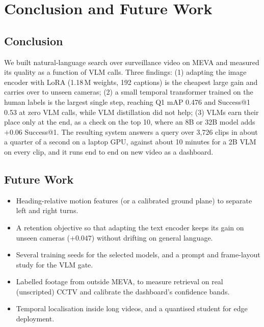 \documentclass[11pt,a4paper]{article}
\begin{document}
\section{Conclusion and Future Work}\label{sec:concl}
\subsection{Conclusion}
We built natural-language search over surveillance video on MEVA and measured its quality as a function of VLM
calls. Three findings: (1) adapting the image encoder with LoRA (1.18\,M weights, 192 captions) is the cheapest
large gain and carries over to unseen cameras; (2) a small temporal transformer trained on the human labels is the
largest single step, reaching Q1 mAP 0.476 and Success@1 0.53 at zero VLM calls, while VLM distillation did not
help; (3) VLMs earn their place only at the end, as a check on the top 10, where an 8B or 32B model adds $+0.06$
Success@1. The resulting system answers a query over 3,726 clips in about a quarter of a second on a laptop GPU,
against about 10 minutes for a 2B VLM on every clip, and it runs end to end on new video as a dashboard.

\subsection{Future Work}
\begin{itemize}
  \item Heading-relative motion features (or a calibrated ground plane) to separate left and right turns.
  \item A retention objective so that adapting the text encoder keeps its gain on unseen cameras ($+0.047$) without
        drifting on general language.
  \item Several training seeds for the selected models, and a prompt and frame-layout study for the VLM gate.
  \item Labelled footage from outside MEVA, to measure retrieval on real (unscripted) CCTV and calibrate the
        dashboard's confidence bands.
  \item Temporal localisation inside long videos, and a quantised student for edge deployment.
\end{itemize}
\end{document}
